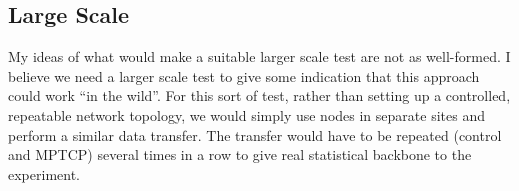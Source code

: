 \documentclass{article}
\begin{document}

\subsection{Large Scale}

My ideas of what would make a suitable larger scale test are not as well-formed.
I believe we need a larger scale test to give some indication that this approach
could work ``in the wild''. For this sort of test, rather than setting up a
controlled, repeatable network topology, we would simply use nodes in separate
sites and perform a similar data transfer. The transfer would have to be
repeated (control and MPTCP) several times in a row to give real statistical
backbone to the experiment.
\end{document}
